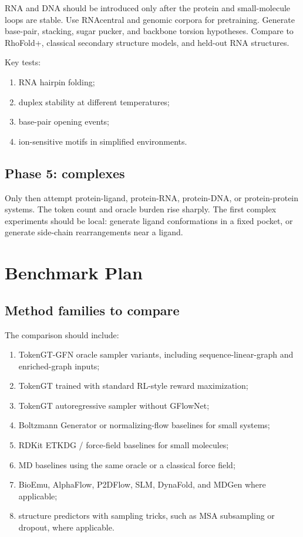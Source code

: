 \documentclass[11pt]{article}
\begin{document}
RNA and DNA should be introduced only after the protein and small-molecule loops are stable. Use RNAcentral and genomic corpora for pretraining. Generate base-pair, stacking, sugar pucker, and backbone torsion hypotheses. Compare to RhoFold+, classical secondary structure models, and held-out RNA structures.

Key tests:
\begin{enumerate}[leftmargin=2em]
  \item RNA hairpin folding;
  \item duplex stability at different temperatures;
  \item base-pair opening events;
  \item ion-sensitive motifs in simplified environments.
\end{enumerate}

\subsection{Phase 5: complexes}

Only then attempt protein-ligand, protein-RNA, protein-DNA, or protein-protein systems. The token count and oracle burden rise sharply. The first complex experiments should be local: generate ligand conformations in a fixed pocket, or generate side-chain rearrangements near a ligand.

\section{Benchmark Plan}

\subsection{Method families to compare}

The comparison should include:
\begin{enumerate}[leftmargin=2em]
  \item TokenGT-GFN oracle sampler variants, including sequence-linear-graph and enriched-graph inputs;
  \item TokenGT trained with standard RL-style reward maximization;
  \item TokenGT autoregressive sampler without GFlowNet;
  \item Boltzmann Generator or normalizing-flow baselines for small systems;
  \item RDKit ETKDG / force-field baselines for small molecules;
  \item MD baselines using the same oracle or a classical force field;
  \item BioEmu, AlphaFlow, P2DFlow, SLM, DynaFold, and MDGen where applicable;
  \item structure predictors with sampling tricks, such as MSA subsampling or dropout, where applicable.
\end{enumerate}
\end{document}
